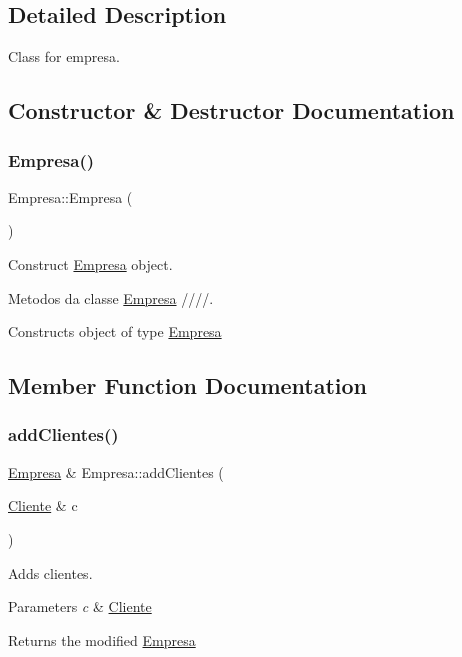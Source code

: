 \subsection{Detailed Description}
Class for empresa. 

\subsection{Constructor \& Destructor Documentation}
\mbox{\label{classEmpresa_aff124b958356c479ab50ddf4cf302193}} 
\subsubsection{\texorpdfstring{Empresa()}{Empresa()}}
{\footnotesize\ttfamily Empresa\+::\+Empresa (\begin{DoxyParamCaption}{ }\end{DoxyParamCaption})}



Construct \hyperlink{classEmpresa}{Empresa} object. 

Metodos da classe \hyperlink{classEmpresa}{Empresa} ////.

Constructs object of type \hyperlink{classEmpresa}{Empresa} 

\subsection{Member Function Documentation}
\mbox{\label{classEmpresa_a57597ec4154f274686bc648ccf5d2a59}} 
\subsubsection{\texorpdfstring{add\+Clientes()}{addClientes()}}
{\footnotesize\ttfamily \hyperlink{classEmpresa}{Empresa} \& Empresa\+::add\+Clientes (\begin{DoxyParamCaption}\item[{\hyperlink{classCliente}{Cliente} \&}]{c }\end{DoxyParamCaption})}



Adds clientes. 


\begin{DoxyParams}{Parameters}
{\em c} & \hyperlink{classCliente}{Cliente}\\
\hline
\end{DoxyParams}
\begin{DoxyReturn}{Returns}
the modified \hyperlink{classEmpresa}{Empresa} 
\end{DoxyReturn}
\mbox{\label{classEmpresa_a0c858479d6e92094adbb2fc085039376}} 
